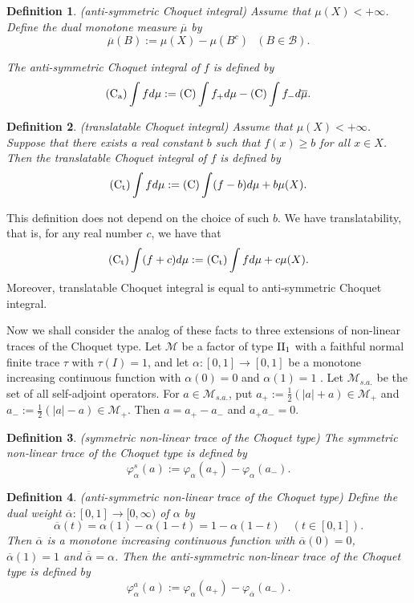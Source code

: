 \documentclass[a4paper,12pt]{amsart}
\newtheorem{definition}{Definition}[section]
\newcommand{\M}{\mathcal{M}}
\begin{document}
\begin{definition} \rm (anti-symmetric Choquet integral)
Assume that $\mu(X) < +\infty$. Define the dual monotone measure $\overline{\mu}$  by 
$$
\overline{\mu}(B) :=\mu(X) - \mu(B^c)   \ \ \ (B \in \mathcal B) .
$$

The anti-symmetric Choquet integral of $f$ is defined by 
$$
{\rm (C_a)} \int f d\mu := {\rm (C)} \int f_+ d\mu - {\rm (C)} \int f_- d\overline{\mu}.
$$
\end{definition}

\begin{definition} \rm (translatable Choquet integral)
Assume that $\mu(X) < +\infty$. Suppose that there exists a real constant $b$ such that 
$f(x) \geq b$ for all $x \in X$. 
Then the translatable Choquet integral of $f$ is defined by 
$$
{\rm (C_t)} \int f d\mu := {\rm (C)} \int (f - b) d\mu + b\mu(X) .
$$
\end{definition}

This definition does not depend on the choice of such $b$. We have translatability, that is,  for any real number $c$, we have that 
$$
{\rm (C_t)} \int (f + c) d\mu := {\rm (C_t)} \int f d\mu + c\mu(X).
$$
Moreover, translatable Choquet integral is equal to anti-symmetric Choquet integral. 


Now we shall consider the analog of these facts to three extensions of non-linear traces of the Choquet type.  
Let $\M$ be a factor of type ${\rm II}_1$ with a faithful normal finite trace $\tau$ with $\tau(I) = 1$, and 
let $\alpha: [0,1]  \rightarrow [0, 1]$ be a 
monotone increasing continuous function with $\alpha(0) = 0$ and $\alpha(1) = 1$ .
Let ${\M}_{s.a.}$ be the set of all self-adjoint operators.  For $a \in {\M}_{s.a.}$, put 
$a_+ := \frac{1}{2} (|a| +a) \in \M_+$ and $a_- := \frac{1}{2} (|a| -a) \in \M_+$.  
Then $a = a_+ - a_-$ and $a_+ a_- = 0$. 

\begin{definition} \rm (symmetric non-linear trace of the Choquet type)
The symmetric non-linear trace of the Choquet type is defined by 
$$
\varphi_{\alpha}^{s}(a) := \varphi_{\alpha}(a_+) - \varphi_{\alpha}(a_-) .
$$
\end{definition}

\begin{definition} \rm (anti-symmetric non-linear trace of the Choquet type)
Define the dual weight $\overline{\alpha}: [0,1]  \rightarrow [0, \infty)$ of $\alpha$ by 
$$
\overline{\alpha}(t) = \alpha(1) -\alpha(1-t) = 1 - \alpha(1-t)  \quad (t \in  [0,1] ).
$$
Then $\overline{\alpha}$ is a monotone increasing continuous function with 
$\overline{\alpha}(0) = 0$, $\overline{\alpha}(1) = 1$ and $\overline{\overline{\alpha}} = \alpha$.  
Then the anti-symmetric non-linear trace of the Choquet type is defined by 
$$
\varphi_{\alpha}^{a}(a) := \varphi_{\alpha}(a_+) - \varphi_{\overline{\alpha}}(a_-).
$$
\end{definition}
\end{document}
